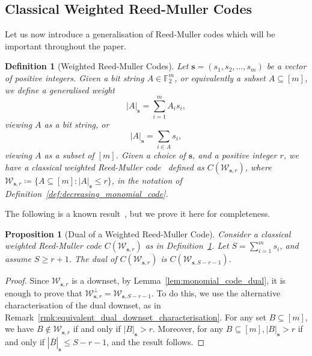 \documentclass{article}
\newcounter{main}[section]
\newtheorem{definition}[main]{Definition}
\newtheorem{proposition}[main]{Proposition}
\begin{document}
\subsection{Classical Weighted Reed-Muller Codes}
Let us now introduce a generalisation of Reed-Muller codes which will be important throughout the paper.

\begin{definition}[Weighted Reed-Muller Codes]\label{def:weighted_RM}
    Let $\boldsymbol{s} = (s_1, s_2, \ldots, s_m)$ be a vector of positive integers. Given a bit string $A \in \mathbb{F}_2^m$, or equivalently a subset $A \subseteq [m]$, we define a generalised weight
    \begin{equation}\label{eq:gen_weight_first_def}
        |A|_{\boldsymbol{s}} = \sum_{i=1}^mA_is_i,
    \end{equation}
    viewing $A$ as a bit string, or
    \begin{equation}
        |A|_{\boldsymbol{s}} = \sum_{i \in A}s_i,
    \end{equation}
    viewing $A$ as a subset of $[m]$.
    Given a choice of $\boldsymbol{s}$, and a positive integer $r$, we have a classical weighted Reed-Muller code~\cite{sorensen1992weighted,geil2013weighted} defined as $C(\mathcal{W}_{\boldsymbol{s},r})$, where $\mathcal{W}_{\boldsymbol{s},r} \coloneq \{A \subseteq [m]: |A|_{\boldsymbol{s}} \leq r\}$, in the notation of Definition~\ref{def:decreasing_monomial_code}.
\end{definition}
The following is a known result~\cite{sorensen1992weighted}, but we prove it here for completeness.
\begin{proposition}[Dual of a Weighted Reed-Muller Code]\label{prop:dual_weighted_rm} Consider a classical weighted Reed-Muller code $C(\mathcal{W}_{\boldsymbol{s},r})$ as in Definition~\ref{def:weighted_RM}. Let $S = \sum_{i=1}^ms_i$, and assume $S \geq r+1$. The dual of $C(\mathcal{W}_{\boldsymbol{s},r})$ is $C(\mathcal{W}_{\boldsymbol{s},S-r-1})$.
\end{proposition}
\begin{proof}
    Since $\mathcal{W}_{\boldsymbol{s},r}$ is a downset, by Lemma~\ref{lem:monomial_code_dual}, it is enough to prove that $\mathcal{W}_{\boldsymbol{s},r}^\perp = \mathcal{W}_{\boldsymbol{s},S-r-1}$. To do this, we use the alternative characterisation of the dual downset, as in Remark~\ref{rmk:equivalent_dual_downset_characterisation}. For any set $B \subseteq [m]$, we have $B \notin \mathcal{W}_{\boldsymbol{s},r}$ if and only if $|B|_{\boldsymbol{s}} > r$. Moreover, for any $B \subseteq [m], |B|_{\boldsymbol{s}}> r$ if and only if $|\bar{B}|_{\boldsymbol{s}}\leq S-r-1$, and the result follows.
\end{proof}
\end{document}
